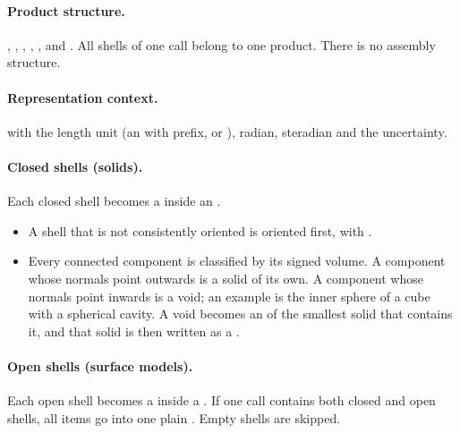 \paragraph{Product structure.} ,
, , ,
,  and
. All shells of one call belong to one product. There is
no assembly structure.

\paragraph{Representation context.}  with the length
unit (an  with prefix, or ), radian,
steradian and the uncertainty.

{\raggedright \paragraph{Closed shells (solids).} Each closed shell becomes a
 inside an
.\par}
\begin{itemize}
  \item A shell that is not consistently oriented is oriented first, with .
  \item Every connected component is classified by its signed volume. A component whose
    normals point outwards is a solid of its own. A component whose normals point inwards is a
    void; an example is the inner sphere of a cube with a spherical cavity. A void becomes an
     of the smallest solid that contains it, and that
    solid is then written as a .
\end{itemize}

{\raggedright \paragraph{Open shells (surface models).} Each open shell becomes a
 inside a
. If one call contains both closed and open
shells, all items go into one plain . Empty shells are skipped.\par}

